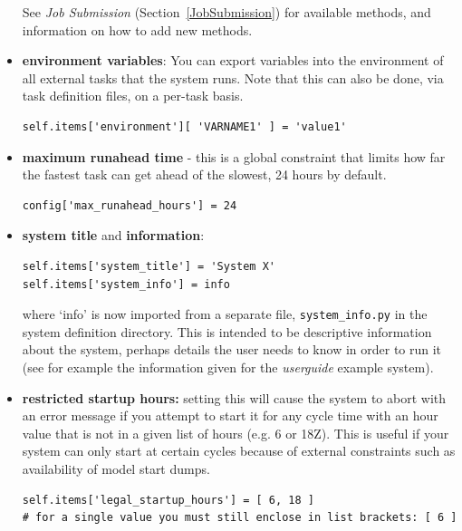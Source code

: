 \documentclass[11pt,a4paper]{article}
\begin{document}
\begin{itemize}
        See {\em Job Submission} (Section~\ref{JobSubmission}) for
        available methods, and information on how to add new methods.

    \item {\bf environment variables}: You can export variables into the 
        environment of all external tasks that the system runs. Note that
        this can also be done, via task definition files, on a per-task
        basis.

        \begin{lstlisting}
self.items['environment'][ 'VARNAME1' ] = 'value1'
        \end{lstlisting}

    \item {\bf maximum runahead time} - this is a global constraint that
        limits how far the fastest task can get ahead of the slowest, 24
        hours by default.
        
        \begin{lstlisting}
config['max_runahead_hours'] = 24
        \end{lstlisting}


    \item {\bf system title} and {\bf information}: 

        \begin{lstlisting}
self.items['system_title'] = 'System X'
self.items['system_info'] = info
        \end{lstlisting}
        where `info' is now imported from a separate file, 
        \lstinline=system_info.py= in the system definition directory.
        This is intended to be descriptive information about the system,
        perhaps details the user needs to know in order to run it (see
        for example the information given for the {\em userguide}
        example system).

    \item {\bf restricted startup hours:} setting this will cause 
        the system to abort with an error message if you attempt to
        start it for any cycle time with an hour value that is not in a given
        list of hours (e.g. 6 or 18Z). This is useful if your system 
        can only start at certain cycles because of external constraints
        such as availability of model start dumps.
        
    \begin{lstlisting}
self.items['legal_startup_hours'] = [ 6, 18 ]
# for a single value you must still enclose in list brackets: [ 6 ] 
    \end{lstlisting}

\end{itemize}
\end{document}
